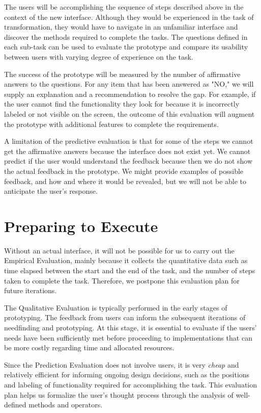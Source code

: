 \documentclass[12pt,letterpaper]{article}
\begin{document}
The users will be accomplishing the sequence of steps described above in the context of the new interface. Although they would be experienced in the task of transformation, they would have to navigate in an unfamiliar interface and discover the methods required to complete the tasks. The questions defined in each sub-task can be used to evaluate the prototype and compare its usability between users with varying degree of experience on the task. 

The success of the prototype will be measured by the number of affirmative answers to the questions. For any item that has been answered as "NO," we will supply an explanation and a recommendation to resolve the gap. For example, if the user cannot find the functionality they look for because it is incorrectly labeled or not visible on the screen, the outcome of this evaluation will augment the prototype with additional features to complete the requirements. 

A limitation of the predictive evaluation is that for some of the steps we cannot get the affirmative answers because the interface does not exist yet. We cannot predict if the user would understand the feedback because then we do not show the actual feedback in the prototype. We might provide examples of possible feedback, and how and where it would be revealed, but we will not be able to anticipate the user's response. 

\section*{Preparing to Execute}

Without an actual interface, it will not be possible for us to carry out the Empirical Evaluation, mainly because it collects the quantitative data such as time elapsed between the start and the end of the task, and the number of steps taken to complete the task. Therefore, we postpone this evaluation plan for future iterations. 

The Qualitative Evaluation is typically performed in the early stages of prototyping. The feedback from users can inform the subsequent iterations of needfinding and prototyping. At this stage, it is essential to evaluate if the users' needs have been sufficiently met before proceeding to implementations that can be more costly regarding time and allocated resources. 

Since the Prediction Evaluation does not involve users, it is very \textit{cheap} and relatively efficient for informing ongoing design decisions, such as the positions and labeling of functionality required for accomplishing the task. This evaluation plan helps us formalize the user's thought process through the analysis of well-defined methods and operators. 
\end{document}
